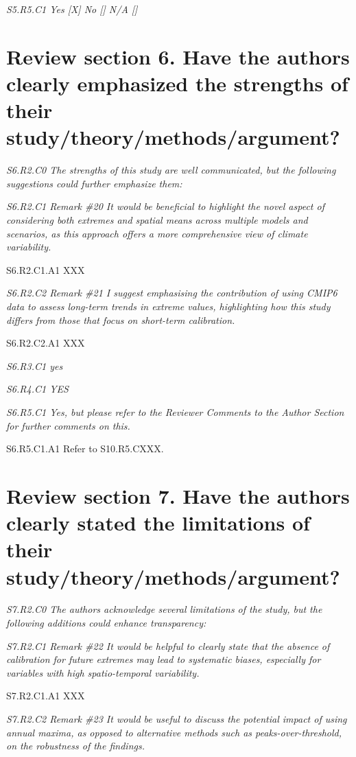 \documentclass[a4paper,10pt]{article}
\begin{document}
	\emph{S5.R5.C1 Yes [X] No [] N/A []}

	\section*{Review section 6. Have the authors clearly emphasized the strengths of their study/theory/methods/argument?}

	\emph{S6.R2.C0 The strengths of this study are well communicated, but the following suggestions could further emphasize them:}

	\emph{S6.R2.C1 Remark \#20 It would be beneficial to highlight the novel aspect of considering both extremes and spatial means across multiple models and scenarios, as this approach offers a more comprehensive view of climate variability.}

	S6.R2.C1.A1 XXX

	\emph{S6.R2.C2 Remark \#21 I suggest emphasising the contribution of using CMIP6 data to assess long-term trends in extreme values, highlighting how this study differs from those that focus on short-term calibration.}

	S6.R2.C2.A1 XXX

	\emph{S6.R3.C1 yes}

	\emph{S6.R4.C1 YES}

	\emph{S6.R5.C1 Yes, but please refer to the Reviewer Comments to the Author Section for further comments on this.}

	S6.R5.C1.A1 Refer to S10.R5.CXXX.

	\section*{Review section 7. Have the authors clearly stated the limitations of their study/theory/methods/argument?}

	\emph{S7.R2.C0 The authors acknowledge several limitations of the study, but the following additions could enhance transparency:}

	\emph{S7.R2.C1 Remark \#22 It would be helpful to clearly state that the absence of calibration for future extremes may lead to systematic biases, especially for variables with high spatio-temporal variability.}

	S7.R2.C1.A1 XXX

	\emph{S7.R2.C2 Remark \#23 It would be useful to discuss the potential impact of using annual maxima, as opposed to alternative methods such as peaks-over-threshold, on the robustness of the findings.}
\end{document}
